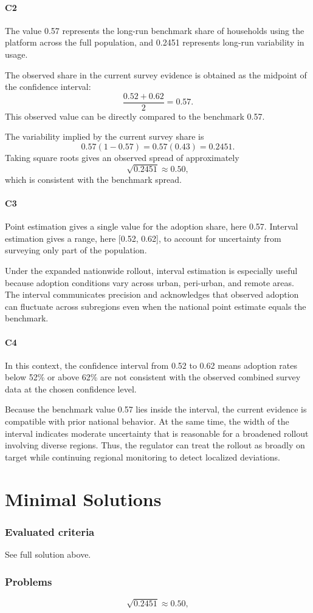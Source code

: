 \begin{ExamProblems}
		\subsection*{C2}
		The value 0.57 represents the long-run benchmark share of households using the platform across the full population, and 0.2451 represents long-run variability in usage.
		
		The observed share in the current survey evidence is obtained as the midpoint of the confidence interval:
		\[
		\frac{0.52 + 0.62}{2} = 0.57.
		\]
		This observed value can be directly compared to the benchmark 0.57.
		
		The variability implied by the current survey share is
		\[
		0.57(1-0.57) = 0.57(0.43) = 0.2451.
		\]
		Taking square roots gives an observed spread of approximately
		\[
		\sqrt{0.2451} \approx 0.50,
		\]
		which is consistent with the benchmark spread.
		
		\subsection*{C3}
		Point estimation gives a single value for the adoption share, here 0.57. Interval estimation gives a range, here [0.52, 0.62], to account for uncertainty from surveying only part of the population.
		
		Under the expanded nationwide rollout, interval estimation is especially useful because adoption conditions vary across urban, peri-urban, and remote areas. The interval communicates precision and acknowledges that observed adoption can fluctuate across subregions even when the national point estimate equals the benchmark.
		
		\subsection*{C4}
		In this context, the confidence interval from 0.52 to 0.62 means adoption rates below 52\% or above 62\% are not consistent with the observed combined survey data at the chosen confidence level.
		
		Because the benchmark value 0.57 lies inside the interval, the current evidence is compatible with prior national behavior. At the same time, the width of the interval indicates moderate uncertainty that is reasonable for a broadened rollout involving diverse regions. Thus, the regulator can treat the rollout as broadly on target while continuing regional monitoring to detect localized deviations.
		
	\end{ExamProblems}


\part{Minimal Solutions}

\section*{Evaluated criteria}
See full solution above.

\section*{Problems}
\[\sqrt{0.2451} \approx 0.50,\]


